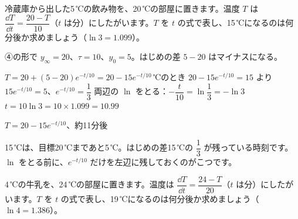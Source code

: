 \begin{reidai}[温まるとき]
冷蔵庫から出した5\,℃の飲み物を、20\,℃の部屋に置きます。温度 $T$ は $\dfrac{\dd T}{\dd t}=\dfrac{20-T}{10}$（$t$ は分）にしたがいます。$T$ を $t$ の式で表し、15\,℃になるのは何分後か求めましょう（$\ln3=1.099$）。\par
\kangaekata ④の形で $y_\infty=20$、$\tau=10$、$y_0=5$。はじめの差 $5-20$ はマイナスになる。\par
\shiki $T=20+(5-20)e^{-t/10}=20-15e^{-t/10}$\,℃のとき $20-15e^{-t/10}=15$ より $15e^{-t/10}=5$、$e^{-t/10}=\dfrac{1}{3}$\bkvieq
両辺の $\ln$ をとる：$-\dfrac{t}{10}=\ln\dfrac{1}{3}=-\ln3$\bkvieq
$t=10\ln3=10\times1.099=10.99$\par
\kotae $T=20-15e^{-t/10}$、約11分後
\end{reidai}
15\,℃は、目標20\,℃まであと5\,℃。はじめの差15\,℃の $\dfrac{1}{3}$ が残っている時刻です。$\ln$ をとる前に、$e^{-t/10}$ だけを左辺に残しておくのがこつです。

\begin{jibun}
4\,℃の牛乳を、24\,℃の部屋に置きます。温度は $\dfrac{\dd T}{\dd t}=\dfrac{24-T}{20}$（$t$ は分）にしたがいます。$T$ を $t$ の式で表し、19\,℃になるのは何分後か求めましょう（$\ln4=1.386$）。
\end{jibun}

